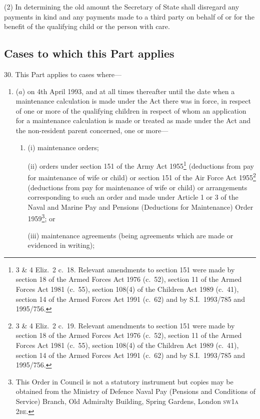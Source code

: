 \documentclass[12pt,a4paper]{article}
\begin{document}
(2) In determining the old amount the Secretary of State shall disregard any payments in kind and any payments made to a third party on behalf of or for the benefit of the qualifying child or the person with care.

\subsection[30. Cases to which this Part applies]{Cases to which this Part applies}

30.  This Part applies to cases where—
\begin{enumerate}\item[]
($a$) on 4th April 1993, and at all times thereafter until the date when a maintenance calculation is made under the Act there was in force, in respect of one or more of the qualifying children in respect of whom an application for a maintenance calculation is made or treated as made under the Act and the non-resident parent concerned, one or more—
\begin{enumerate}\item[]
(i) maintenance orders;

(ii) orders under section 151 of the Army Act 1955\footnote{3 \& 4 Eliz.\ 2 c.\ 18. Relevant amendments to section 151 were made by section 18 of the Armed Forces Act 1976 (c.\ 52), section 11 of the Armed Forces Act 1981 (c.\ 55), section 108(4) of the Children Act 1989 (c.\ 41), section 14 of the Armed Forces Act 1991 (c.\ 62) and by S.I.\ 1993/785 and 1995/756.} (deductions from pay for maintenance of wife or child) or section 151 of the Air Force Act 1955\footnote{3 \& 4 Eliz.\ 2 c.\ 19. Relevant amendments to section 151 were made by section 18 of the Armed Forces Act 1976 (c.\ 52), section 11 of the Armed Forces Act 1981 (c.\ 55), section 108(4) of the Children Act 1989 (c.\ 41), section 14 of the Armed Forces Act 1991 (c.\ 62) and by S.I.\ 1993/785 and 1995/756.} (deductions from pay for maintenance of wife or child) or arrangements corresponding to such an order and made under Article 1 or 3 of the Naval and Marine Pay and Pensions (Deductions for Maintenance) Order 1959\footnote{\frenchspacing This Order in Council is not a statutory instrument but copies may be obtained from the Ministry of Defence Naval Pay (Pensions and Conditions of Service) Branch, Old Admiralty Building, Spring Gardens, London \textsc{\lowercase{SW1A 2BE}}.}; or

(iii) maintenance agreements (being agreements which are made or evidenced in writing);
\end{enumerate}


\end{enumerate}
\end{document}
